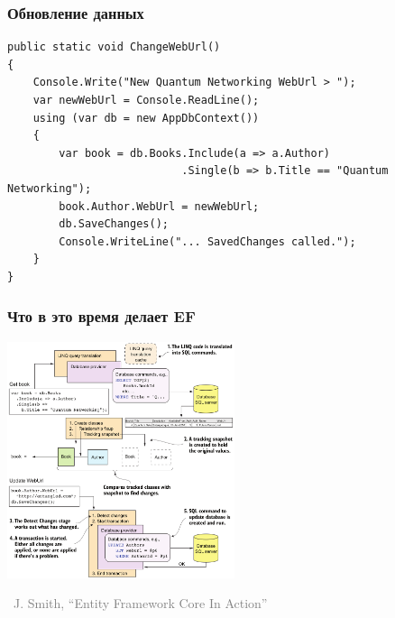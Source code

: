 \documentclass[xetex,mathserif,serif]{beamer}
\newcommand{\attribution}[1] {
\vspace{-5mm}\begin{flushright}\begin{scriptsize}\textcolor{gray}{\textcopyright\, #1}\end{scriptsize}\end{flushright}
}
\begin{document}
    \begin{frame}[fragile]
        \frametitle{Обновление данных}
        \begin{footnotesize}
            \begin{verbatim}
public static void ChangeWebUrl()
{
    Console.Write("New Quantum Networking WebUrl > ");
    var newWebUrl = Console.ReadLine();
    using (var db = new AppDbContext())
    {
        var book = db.Books.Include(a => a.Author)
                           .Single(b => b.Title == "Quantum Networking");
        book.Author.WebUrl = newWebUrl;
        db.SaveChanges();
        Console.WriteLine("... SavedChanges called.");
    }
}
            \end{verbatim}
        \end{footnotesize}
    \end{frame}

    \begin{frame}
        \frametitle{Что в это время делает EF}
        \begin{center}
            \includegraphics[width=0.5\textwidth]{efCoreUpdate.png}
            \attribution{J. Smith, ``Entity Framework Core In Action''}
        \end{center}
    \end{frame}
\end{document}
